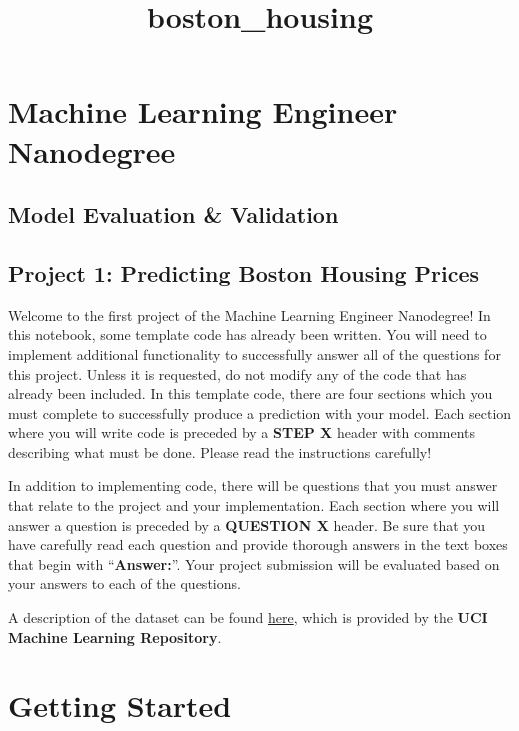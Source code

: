 \documentclass{article}
\title{boston\_housing}
\begin{document}
    
    
    \maketitle
    
    

    
    \section{Machine Learning Engineer
Nanodegree}\label{machine-learning-engineer-nanodegree}

\subsection{Model Evaluation \&
Validation}\label{model-evaluation-validation}

\subsection{Project 1: Predicting Boston Housing
Prices}\label{project-1-predicting-boston-housing-prices}

Welcome to the first project of the Machine Learning Engineer
Nanodegree! In this notebook, some template code has already been
written. You will need to implement additional functionality to
successfully answer all of the questions for this project. Unless it is
requested, do not modify any of the code that has already been included.
In this template code, there are four sections which you must complete
to successfully produce a prediction with your model. Each section where
you will write code is preceded by a \textbf{STEP X} header with
comments describing what must be done. Please read the instructions
carefully!

In addition to implementing code, there will be questions that you must
answer that relate to the project and your implementation. Each section
where you will answer a question is preceded by a \textbf{QUESTION X}
header. Be sure that you have carefully read each question and provide
thorough answers in the text boxes that begin with ``\textbf{Answer:}''.
Your project submission will be evaluated based on your answers to each
of the questions.

A description of the dataset can be found
\href{https://archive.ics.uci.edu/ml/datasets/Housing}{here}, which is
provided by the \textbf{UCI Machine Learning Repository}.

    \section{Getting Started}\label{getting-started}
\end{document}

